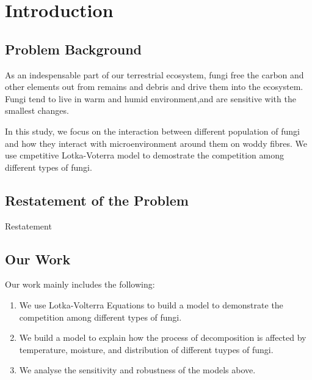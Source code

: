 \section{Introduction}
	\subsection{Problem Background}
	As an indespensable part of our terrestrial ecosystem, fungi free the carbon and other elements out from remains and debris and drive them into the ecosystem. Fungi tend to live in warm and humid environment,and are sensitive with the smallest changes.

	In this study, we focus on the interaction between different population of fungi and how they interact with microenvironment around them on woddy fibres. We use cmpetitive Lotka-Voterra model to demostrate the competition among different types of fungi.
	\subsection{Restatement of the Problem}
	Restatement
	\subsection{Our Work}
	Our work mainly includes the following:
	\begin{enumerate}[\bfseries 1.]
		\item We use Lotka-Volterra Equations to build a model to demonstrate the competition among different types of fungi.
		\item We build a model to explain how the process of decomposition is affected by temperature, moisture, and distribution of different tuypes of fungi.
		\item We analyse the sensitivity and robustness of the models above.
	\end{enumerate}
	